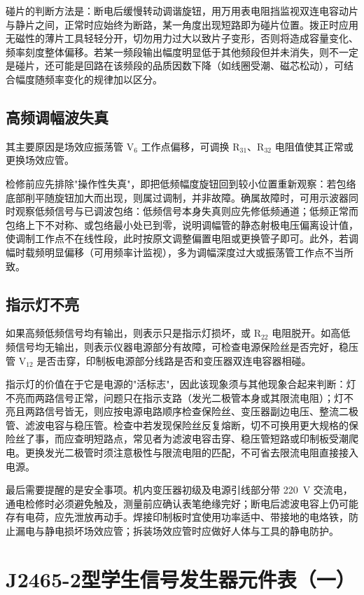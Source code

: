\documentclass[12pt,UTF8]{ctexbook}
\begin{document}
	碰片的判断方法是：断电后缓慢转动调谐旋钮，用万用表电阻挡监视双连电容动片与静片之间，正常时应始终为断路，某一角度出现短路即为碰片位置。拨正时应用无磁性的薄片工具轻轻分开，切勿用力过大以致片子变形，否则将造成容量变化、频率刻度整体偏移。若某一频段输出幅度明显低于其他频段但并未消失，则不一定是碰片，还可能是回路在该频段的品质因数下降（如线圈受潮、磁芯松动），可结合幅度随频率变化的规律加以区分。
	
	\subsection{高频调幅波失真}
	其主要原因是场效应振荡管 V\(_6\) 工作点偏移，可调换 R\(_{31}\)、R\(_{32}\) 电阻值使其正常或更换场效应管。
	
	检修前应先排除"操作性失真"，即把低频幅度旋钮回到较小位置重新观察：若包络底部削平随旋钮加大而出现，则属过调制，并非故障。确属故障时，可用示波器同时观察低频信号与已调波包络：低频信号本身失真则应先修低频通道；低频正常而包络上下不对称、或包络最小处已到零，说明调幅管的静态射极电压偏离设计值，使调制工作点不在线性段，此时按原文调整偏置电阻或更换管子即可。此外，若调幅时载频明显偏移（可用频率计监视），多为调幅深度过大或振荡管工作点不当所致。
	
	\subsection{指示灯不亮}
	如果高频低频信号均有输出，则表示只是指示灯损坏，或 R\(_{22}\) 电阻脱开。如高低频信号均无输出，则表示仪器电源部分有故障，可检查电源保险丝是否完好，稳压管 V\(_{12}\) 是否击穿，印制板电源部分线路是否和变压器双连电容器相碰。
	
	指示灯的价值在于它是电源的"活标志"，因此该现象须与其他现象合起来判断：灯不亮而两路信号正常，问题只在指示支路（发光二极管本身或其限流电阻）；灯不亮且两路信号皆无，则应按电源电路顺序检查保险丝、变压器副边电压、整流二极管、滤波电容与稳压管。检查中若发现保险丝反复熔断，切不可换用更大规格的保险丝了事，而应查明短路点，常见者为滤波电容击穿、稳压管短路或印制板受潮爬电。更换发光二极管时须注意极性与限流电阻的匹配，不可省去限流电阻直接接入电源。
	
	最后需要提醒的是安全事项。机内变压器初级及电源引线部分带 220~V 交流电，通电检修时必须避免触及，测量前应确认表笔绝缘完好；断电后滤波电容上仍可能存有电荷，应先泄放再动手。焊接印制板时宜使用功率适中、带接地的电烙铁，防止漏电与静电损坏场效应管；拆装场效应管时应做好人体与工具的静电防护。
	
	\appendix
	\section{J2465-2型学生信号发生器元件表（一）}
	
\end{document}
